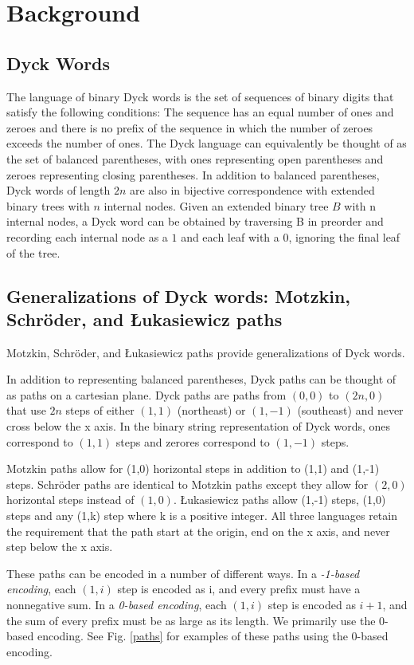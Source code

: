 \section{Background}
\subsection{Dyck Words}
The language of binary Dyck words is the set of sequences of binary digits that satisfy the following conditions: The sequence has an equal number of ones and zeroes and there is no prefix of the sequence in which the number of zeroes exceeds the number of ones.  The Dyck language can equivalently be thought of as the set of balanced parentheses, with ones representing open parentheses and zeroes representing closing parentheses.  
In addition to balanced parentheses, Dyck words of length $2n$ are also in bijective correspondence with extended binary trees with $n$ internal nodes. 
Given an extended binary tree $B$ with n internal nodes, a Dyck word can be obtained by traversing B in preorder and recording each internal node as a $1$ and each leaf with a $0$, ignoring the final leaf of the tree.

\subsection{Generalizations of Dyck words: Motzkin, Schröder, and Łukasiewicz paths}
Motzkin, Schröder, and Łukasiewicz paths provide generalizations of Dyck words.  

In addition to representing balanced parentheses, Dyck paths can be thought of as paths on a cartesian plane.  Dyck paths are paths from $(0,0)$ to $(2n,0)$ that use $2n$ steps of either $(1,1)$ (northeast) or $(1,-1)$ (southeast) and never cross below the x axis. In the binary string representation of Dyck words, ones correspond to $(1,1)$ steps and zerores correspond to $(1,-1)$ steps.

Motzkin paths allow for (1,0) horizontal steps in addition to (1,1) and (1,-1) steps. Schröder paths are identical to Motzkin paths except they allow for $(2,0)$ horizontal steps instead of $(1,0)$.  Łukasiewicz paths allow (1,-1) steps, (1,0) steps and any (1,k) step where k is a positive integer.  All three languages retain the requirement that the path start at the origin, end on the x axis, and never step below the x axis. 

These paths can be encoded in a number of different ways.  In a \emph{-1-based encoding}, each $(1,i)$ step is encoded as i, and every prefix must have a nonnegative sum.  In a \emph{0-based encoding}, each $(1,i)$ step is encoded as $i+1$, and the sum of every prefix must be as large as its length. We primarily use the 0-based encoding. See Fig. \ref{paths}  for examples of these paths using the 0-based encoding.

